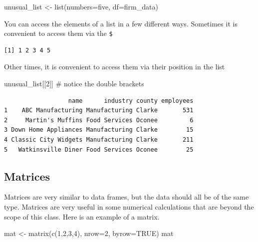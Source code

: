 \documentclass[
  letterpaper,
  DIV=11,
  numbers=noendperiod]{scrreprt}
\newenvironment{Shaded}{\begin{snugshade}}{\end{snugshade}}
\newcommand{\AttributeTok}[1]{\textcolor[rgb]{0.40,0.45,0.13}{#1}}
\newcommand{\CommentTok}[1]{\textcolor[rgb]{0.37,0.37,0.37}{#1}}
\newcommand{\ConstantTok}[1]{\textcolor[rgb]{0.56,0.35,0.01}{#1}}
\newcommand{\DecValTok}[1]{\textcolor[rgb]{0.68,0.00,0.00}{#1}}
\newcommand{\FunctionTok}[1]{\textcolor[rgb]{0.28,0.35,0.67}{#1}}
\newcommand{\NormalTok}[1]{\textcolor[rgb]{0.00,0.23,0.31}{#1}}
\newcommand{\OtherTok}[1]{\textcolor[rgb]{0.00,0.23,0.31}{#1}}
\newcommand{\SpecialCharTok}[1]{\textcolor[rgb]{0.37,0.37,0.37}{#1}}
\begin{document}
\begin{Shaded}
\begin{Highlighting}[]
\NormalTok{unusual\_list }\OtherTok{\textless{}{-}} \FunctionTok{list}\NormalTok{(}\AttributeTok{numbers=}\NormalTok{five, }\AttributeTok{df=}\NormalTok{firm\_data)}
\end{Highlighting}
\end{Shaded}

You can access the elements of a list in a few different ways. Sometimes
it is convenient to access them via the \texttt{\$}

\begin{Shaded}
\end{Shaded}

\begin{verbatim}
[1] 1 2 3 4 5
\end{verbatim}

Other times, it is convenient to access them via their position in the
list

\begin{Shaded}
\begin{Highlighting}[]
\NormalTok{unusual\_list[[}\DecValTok{2}\NormalTok{]] }\CommentTok{\# notice the double brackets}
\end{Highlighting}
\end{Shaded}

\begin{verbatim}
                  name      industry county employees
1    ABC Manufacturing Manufacturing Clarke       531
2     Martin's Muffins Food Services Oconee         6
3 Down Home Appliances Manufacturing Clarke        15
4 Classic City Widgets Manufacturing Clarke       211
5   Watkinsville Diner Food Services Oconee        25
\end{verbatim}

\subsection{Matrices}\label{matrices}

Matrices are very similar to data frames, but the data should all be of
the same type. Matrices are very useful in some numerical calculations
that are beyond the scope of this class. Here is an example of a matrix.

\begin{Shaded}
\begin{Highlighting}[]
\NormalTok{mat }\OtherTok{\textless{}{-}} \FunctionTok{matrix}\NormalTok{(}\FunctionTok{c}\NormalTok{(}\DecValTok{1}\NormalTok{,}\DecValTok{2}\NormalTok{,}\DecValTok{3}\NormalTok{,}\DecValTok{4}\NormalTok{), }\AttributeTok{nrow=}\DecValTok{2}\NormalTok{, }\AttributeTok{byrow=}\ConstantTok{TRUE}\NormalTok{)}
\NormalTok{mat}
\end{Highlighting}
\end{Shaded}
\end{document}
